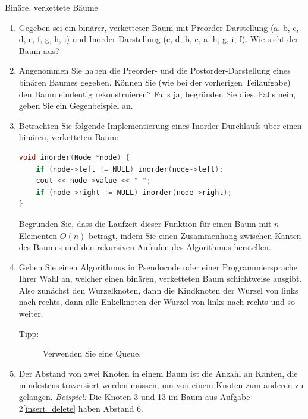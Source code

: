 \documentclass[11pt,a4paper]{article}
\begin{document}
\thispagestyle{empty}





\begin{aufgabe}{1}{Binäre, verkettete Bäume}
    \begin{enumerate}
        \item Gegeben sei ein binärer, verketteter Baum mit Preorder-Darstellung (a, b, c, d, e, f, g, h, i) und Inorder-Darstellung (c, d, b, e, a, h, g, i, f).
        Wie sieht der Baum aus?
        \item Angenommen Sie haben die Preorder- und die Postorder-Darstellung eines binären Baumes gegeben.
        Können Sie (wie bei der vorherigen Teilaufgabe) den Baum eindeutig rekonstruieren?
        Falls ja, begründen Sie dies.
        Falls nein, geben Sie ein Gegenbeispiel an.
        \item Betrachten Sie folgende Implementierung eines Inorder-Durchlaufs über einen binären, verketteten Baum:
        \begin{lstlisting}[language=c++]
void inorder(Node *node) {
    if (node->left != NULL) inorder(node->left);
    cout << node->value << " ";
    if (node->right != NULL) inorder(node->right);
}
        \end{lstlisting}
        Begründen Sie, dass die Laufzeit dieser Funktion für einen Baum mit $n$ Elementen $O(n)$ beträgt, indem Sie einen Zusammenhang zwischen Kanten des Baumes und den rekursiven Aufrufen des Algorithmus herstellen.   
        \item 
        \hard Geben Sie einen Algorithmus in Pseudocode oder einer Programmiersprache Ihrer Wahl an, welcher einen binären, verketteten Baum schichtweise ausgibt.
        Also zunächst den Wurzelknoten, dann die Kindknoten der Wurzel von links nach rechts, dann alle Enkelknoten der Wurzel von links nach rechts und so weiter.
        \begin{description}
            \item[Tipp:] Verwenden Sie eine Queue.
        \end{description}
        \item
        \hard Der Abstand von zwei Knoten in einem Baum ist die Anzahl an Kanten, die mindestens traversiert werden müssen, um von einem Knoten zum anderen zu gelangen.
        \emph{Beispiel:} Die Knoten 3 und 13 im Baum aus Aufgabe 2\ref*{insert_delete} haben Abstand 6.


\end{enumerate}
\end{aufgabe}
\end{document}
